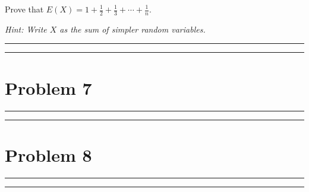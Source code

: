 \documentclass{article}
\theoremstyle{definition}
\newenvironment{solution}{\bigskip\hrule{\hfill}}{\bigskip\hrule{\hfill}} %
\begin{document}
Prove that $E\left(X\right)=1+\frac{1}{2}+\frac{1}{3}+\cdots+\frac{1}{n}$. \medskip

\emph{Hint: Write $X$ as the sum of simpler random variables.}
\begin{solution}


\end{solution}


\newpage


\section*{Problem 7}


\begin{solution}


\end{solution}


\newpage


\section*{Problem 8}

\begin{solution}


\end{solution}


\newpage

\end{document}

